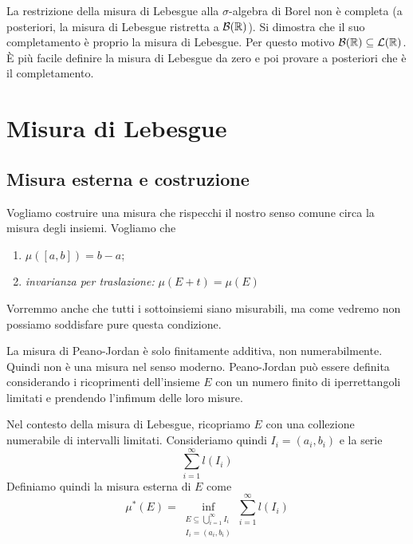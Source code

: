 \documentclass[a4paper]{article}
\begin{document}
\begin{radioactive}
La restrizione della misura di Lebesgue alla \(\sigma\)-algebra di Borel non è completa
(a posteriori, la misura di Lebesgue ristretta a \(\mathcal B(\mathbb{R})\)).
Si dimostra che il suo completamento è proprio la misura di Lebesgue.
Per questo motivo \(\mathcal B(\mathbb{R}) \subseteq \mathcal L(\mathbb{R})\).
È più facile definire la misura di Lebesgue da zero e poi
provare a posteriori che è il completamento.
\end{radioactive}

\section{Misura di Lebesgue}

\subsection{Misura esterna e costruzione}

\begin{radioactive}
Vogliamo costruire
una misura che rispecchi il nostro senso comune circa la misura degli insiemi.
Vogliamo che
\begin{enumerate}
    \item \(\mu([a,b]) = b-a\);
    \item \emph{invarianza per traslazione:} \(\mu(E + t) = \mu(E)\)
\end{enumerate}
Vorremmo anche che tutti i sottoinsiemi siano misurabili, ma come vedremo non possiamo
soddisfare pure questa condizione.
\end{radioactive}

\begin{radioactive}
La misura di Peano-Jordan è solo finitamente additiva, non numerabilmente.
Quindi non è una misura nel senso moderno.
Peano-Jordan può essere definita considerando i ricoprimenti dell'insieme \(E\)
con un numero finito di iperrettangoli limitati e prendendo l'infimum delle loro misure.
\end{radioactive}

\begin{radioactive}
Nel contesto della misura di Lebesgue, ricopriamo \(E\)
con una collezione numerabile di intervalli limitati.
Consideriamo quindi \(I_i = (a_i, b_i)\) e la serie
\[
    \sum_{i=1}^\infty l(I_i)
\]
Definiamo quindi la misura esterna di \(E\)
come \[
    \mu^*(E) = \inf_{\substack{E\subseteq\bigcup_{i=1}^\infty I_i \\ I_i = (a_i, b_i)}}
    \sum_{i=1}^\infty l(I_i)
\]
\end{radioactive}
\end{document}
